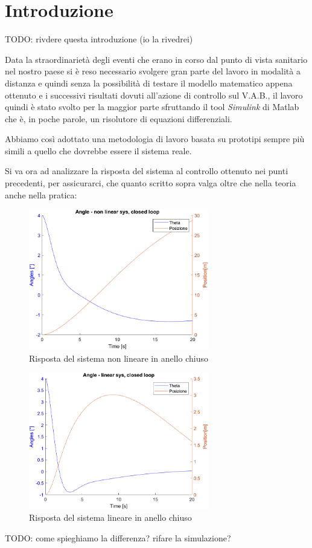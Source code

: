 \section{Introduzione}

TODO: rivdere questa introduzione (io la rivedrei)

Data la straordinarietà degli eventi che erano in corso dal punto di vista sanitario nel nostro paese si è reso necessario svolgere gran parte del lavoro in modalità a distanza e quindi senza la possibilità di testare il modello matematico appena ottenuto e i successivi risultati dovuti all'azione di controllo sul V.A.B., il lavoro quindi è stato svolto per la maggior parte sfruttando il tool \textit{Simulink} di Matlab che è, in poche parole, un risolutore di equazioni differenziali.

Abbiamo così adottato una metodologia di lavoro basata su prototipi sempre più simili a quello che dovrebbe essere il sistema reale.

Si va ora ad analizzare la risposta del sistema al controllo ottenuto nei punti precedenti, per assicurarci, che quanto scritto sopra valga oltre che nella teoria anche nella pratica:
\begin{figure}[H]
	\centering   	
	\includegraphics[width=0.7\textwidth]{Immagini/closed_loop_non_linear.png}
	\caption{Risposta del sistema non lineare in anello chiuso}
	\label{fig:closed_loop_non_linear_response}
\end{figure}
\begin{figure}[H]
	\centering   	
	\includegraphics[width=0.7\textwidth]{Immagini/closed_loop_linear.png}
	\caption{Risposta del sistema lineare in anello chiuso}
	\label{fig:closed_loop_linear_response}
\end{figure}
TODO: come spieghiamo la differenza? rifare la simulazione?



